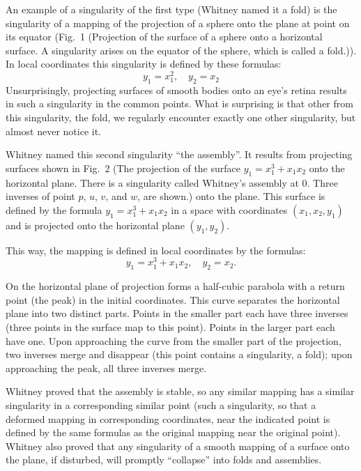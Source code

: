 \documentclass[12pt]{amsart}
\begin{document}
An example of a singularity of the first type (Whitney named it a fold) is the
singularity of a mapping of the projection of a sphere onto the plane at point
on its equator (Fig.\ 1 (Projection of the surface of a sphere onto a horizontal
surface.
A singularity arises on the equator of the sphere, which is called a fold.)).
In local coordinates this singularity is defined by these formulas:
$$y_1=x_1^2,\quad y_2=x_2$$
Unsurprisingly, projecting surfaces of smooth bodies onto an eye's retina
results in such a singularity in the common points.
What is surprising is that other from this singularity, the fold, we regularly
encounter exactly one other singularity, but almost never notice it.

Whitney named this second singularity ``the assembly''.
It results from projecting surfaces shown in Fig.\ 2 (The projection of the
surface $y_1=x_1^3+x_1x_2$ onto the horizontal plane.
There is a singularity called Whitney's assembly at 0.
Three inverses of point $p$, $u$, $v$, and $w$, are shown.) onto the plane.
This surface is defined by the formula $y_1=x_1^3+x_1x_2$ in a space with
coordinates $(x_1,x_2,y_1)$ and is projected onto the horizontal plane
$(y_1,y_2)$.

This way, the mapping is defined in local coordinates by the formulas:
$$y_1=x_1^3+x_1x_2,\quad y_2=x_2.$$

On the horizontal plane of projection forms a half-cubic parabola with a return
point (the peak) in the initial coordinates.
This curve separates the horizontal plane into two distinct parts.
Points in the smaller part each have three inverses (three points in the surface
map to this point).
Points in the larger part each have one.
Upon approaching the curve from the smaller part of the projection, two inverses
merge and disappear (this point contains a singularity, a fold); upon
approaching the peak, all three inverses merge.

Whitney proved that the assembly is stable, so any similar mapping has a
similar singularity in a corresponding similar point (such a singularity, so
that a deformed mapping in corresponding coordinates, near the indicated point
is defined by the same formulas as the original mapping near the original point).
Whitney also proved that any singularity of a smooth mapping of a surface onto
the plane, if disturbed, will promptly ``collapse'' into folds and assemblies.
\end{document}
